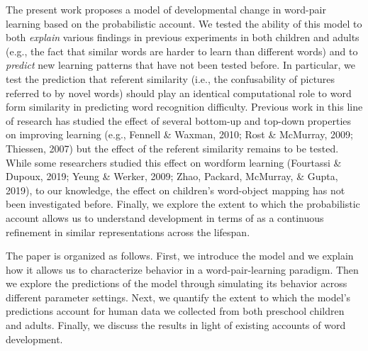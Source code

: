 \documentclass[english,,man]{apa6}
\begin{document}
The present work proposes a model of developmental change in word-pair learning based on the probabilistic account. We tested the ability of this model to both \emph{explain} various findings in previous experiments in both children and adults (e.g., the fact that similar words are harder to learn than different words) and to \emph{predict} new learning patterns that have not been tested before. In particular, we test the prediction that referent similarity (i.e., the confusability of pictures referred to by novel words) should play an identical computational role to word form similarity in predicting word recognition difficulty.
Previous work in this line of research has studied the effect of several bottom-up and top-down properties on improving learning (e.g., Fennell \& Waxman, 2010; Rost \& McMurray, 2009; Thiessen, 2007) but the effect of the referent similarity remains to be tested. While some researchers studied this effect on wordform learning (Fourtassi \& Dupoux, 2019; Yeung \& Werker, 2009; Zhao, Packard, McMurray, \& Gupta, 2019), to our knowledge, the effect on children's word-object mapping has not been investigated before. Finally, we explore the extent to which the probabilistic account allows us to understand development in terms of as a continuous refinement in similar representations across the lifespan.

The paper is organized as follows. First, we introduce the model and we explain how it allows us to characterize behavior in a word-pair-learning paradigm. Then we explore the predictions of the model through simulating its behavior across different parameter settings. Next, we quantify the extent to which the model's predictions account for human data we collected from both preschool children and adults. Finally, we discuss the results in light of existing accounts of word development.
\end{document}
